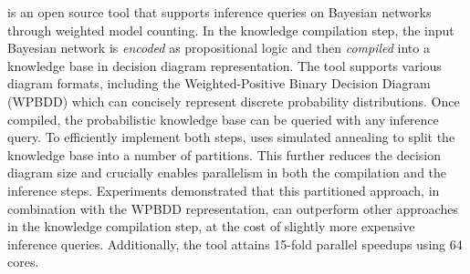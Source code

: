 
\toolname is an open source tool that supports inference queries on Bayesian networks through weighted model counting.
In the knowledge compilation step, the input Bayesian network is \emph{encoded} as propositional logic and then \emph{compiled} into a knowledge base in decision diagram representation. The tool supports various diagram formats, including the Weighted-Positive Binary Decision Diagram (WPBDD) which can concisely represent discrete probability distributions.
Once compiled, the probabilistic knowledge base can be queried with any inference query.
To efficiently implement both steps, \toolname uses simulated annealing to split the knowledge base into a number of partitions. This further reduces the decision diagram size and crucially enables parallelism in both the compilation and the inference steps.
Experiments demonstrated that this partitioned approach, in combination with the WPBDD representation, can outperform other approaches in the knowledge compilation step, at the cost of slightly more expensive inference queries.
Additionally, the tool attains 15-fold parallel speedups using 64 cores.





